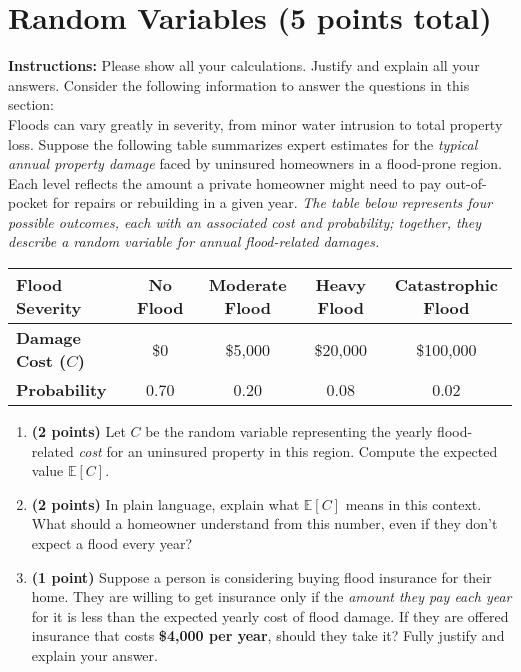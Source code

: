 \documentclass{article}
\newcommand{\blankbox}[2][3cm]{%
    \vspace{-0.5em}
    \begin{figure}[H]
        \makebox[\linewidth]{%
            \begin{tcolorbox}[
                colback=white,
                colframe=white,  %
                width=#2, %
                height=#1,
                boxrule=0.2mm
            ]
            \end{tcolorbox}
        }
    \end{figure}
    \vspace{-2em}
}
\begin{document}
\newpage

\section{Random Variables (5 points total)}
\noindent\textbf{Instructions:} Please show all your calculations. Justify and explain all your answers. Consider the following information to answer the questions in this section: \\

Floods can vary greatly in severity, from minor water intrusion to total property loss. Suppose the following table summarizes expert estimates for the \emph{typical annual property damage} faced by uninsured homeowners in a flood-prone region. Each level reflects the amount a private homeowner might need to pay out-of-pocket for repairs or rebuilding in a given year. \textit{The table below represents four possible outcomes, each with an associated cost and probability; together, they describe a random variable for annual flood-related damages.}

\begin{center}
\begin{tabular}{|l|c|c|c|c|}
\hline
\textbf{Flood Severity} & No Flood & Moderate Flood & Heavy Flood & Catastrophic Flood \\
\hline
\textbf{Damage Cost ($C$)} & \$0 & \$5,000 & \$20,000 & \$100,000 \\
\hline
\textbf{Probability} & 0.70 & 0.20 & 0.08 & 0.02 \\
\hline
\end{tabular}
\end{center}

\begin{enumerate}
\item \textbf{(2 points)} Let $C$ be the random variable representing the yearly flood-related \emph{cost} for an uninsured property in this region. Compute the expected value $\mathbb{E}[C]$. \blankbox[6cm]{1.0\linewidth}

\item \textbf{(2 points)} In plain language, explain what $\mathbb{E}[C]$ means in this context. What should a homeowner understand from this number, even if they don’t expect a flood every year? \blankbox[5cm]{1.0\linewidth}

\item \textbf{(1 point)} Suppose a person is considering buying flood insurance for their home. They are willing to get insurance only if the \emph{amount they pay each year} for it is less than the expected yearly cost of flood damage. If they are offered insurance that costs \textbf{\$4,000 per year}, should they take it? Fully justify and explain your answer. %
\end{enumerate}
\end{document}
